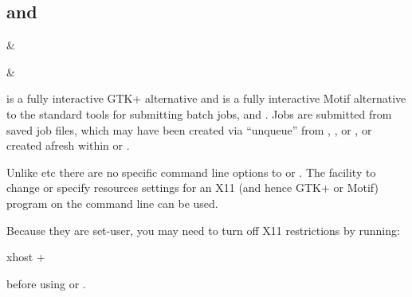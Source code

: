 \subsection{\XbtrName{} and \XmbtrName}

\begin{expara}

\XbtrName{} \&

\XmbtrName{} \&

\end{expara}

\PrXbtr{} is a fully interactive GTK+ alternative and \PrXmbtr{} is a fully interactive Motif alternative to
the standard tools for submitting batch jobs, \PrBtr{} and \PrRbtr{}. Jobs are submitted from saved job files, which may have been created via
``unqueue'' from \PrBtq{}, \PrXbtq{}, \PrXmbtq{} or \PrBtjdel{}, or created afresh within \PrXbtr{} or \PrXmbtr{}.

Unlike \PrBtr{} etc there are no specific command line options to \PrXbtr{} or \PrXmbtr{}. The facility to change or specify resources settings
for an X11 (and hence GTK+ or Motif) program on the command line can be used.

Because they are set-user, you may need to turn off X11 restrictions by running:

\begin{expara}

xhost +

\end{expara}

before using \PrXbtr{} or \PrXmbtr.

